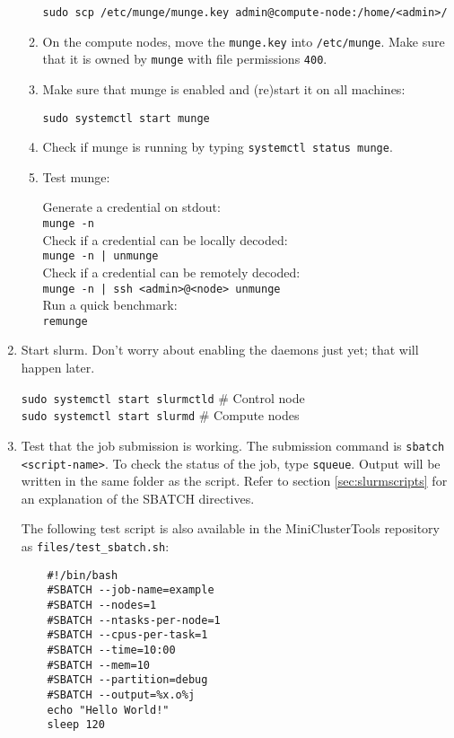 \begin{enumerate}
\begin{enumerate}
		\texttt{sudo scp /etc/munge/munge.key admin@compute-node:/home/<admin>/}

	\item On the compute nodes, move the \texttt{munge.key} into \texttt{/etc/munge}. Make sure that it is owned by \texttt{munge} with file permissions \texttt{400}.

	\item Make sure that munge is enabled and (re)start it on all machines:

		\texttt{sudo systemctl start munge}

	\item Check if munge is running by typing \texttt{systemctl status munge}.

	\item Test munge: 

	    Generate a credential on stdout: \\
	    \texttt{munge -n} \\
	    Check if a credential can be locally decoded: \\
	    \texttt{munge -n | unmunge} \\
	    Check if a credential can be remotely decoded: \\
	    \texttt{munge -n | ssh <admin>@<node> unmunge} \\
	    Run a quick benchmark: \\
	    \texttt{remunge}

	\end{enumerate}

\item Start slurm. Don't worry about enabling the daemons just yet; that will happen later.

	\texttt{sudo systemctl start slurmctld} \quad \# Control node \\
	\texttt{sudo systemctl start slurmd} \quad \# Compute nodes 

\item Test that the job submission is working. The submission command is \texttt{sbatch <script-name>}. To check the status of the job, type \texttt{squeue}. Output will be written in the same folder as the script. Refer to section \ref{sec:slurmscripts} for an explanation of the SBATCH directives.

The following test script is also available in the MiniClusterTools repository as \texttt{files/test\_sbatch.sh}:
\begin{verbatim}
	#!/bin/bash
	#SBATCH --job-name=example
	#SBATCH --nodes=1
	#SBATCH --ntasks-per-node=1
	#SBATCH --cpus-per-task=1
	#SBATCH --time=10:00
	#SBATCH --mem=10
	#SBATCH --partition=debug
	#SBATCH --output=%x.o%j
	echo "Hello World!"
	sleep 120
\end{verbatim}


\end{enumerate}

